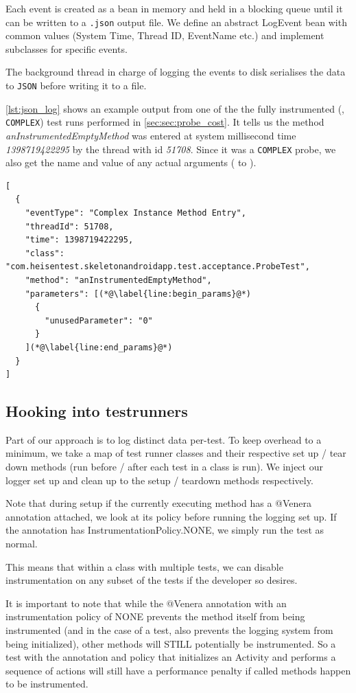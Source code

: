 Each event is created as a bean in memory and held in a blocking queue until it
can be written to a {\tt .json} output file. We define an abstract LogEvent bean
with common values (System Time, Thread ID, EventName etc.) and implement
subclasses for specific events.

The background thread in charge of logging the events to disk serialises the
data to {\tt JSON} before writing it to a file.

\autoref{lst:json_log} shows an example output from one of the the fully
instrumented (\ie, {\tt COMPLEX}) test runs performed in
\autoref{sec:sec:probe_cost}. It tells us the method
\textit{anInstrumentedEmptyMethod} was entered at system millisecond time
\textit{1398719422295} by the thread with id \textit{51708}. Since it was a
{\tt COMPLEX} probe, we also get the name and value of any actual arguments
( to ).

\begin{lstlisting}[label=lst:json_log]
[
  {
    "eventType": "Complex Instance Method Entry",
    "threadId": 51708,
    "time": 1398719422295,
    "class": "com.heisentest.skeletonandroidapp.test.acceptance.ProbeTest",
    "method": "anInstrumentedEmptyMethod",
    "parameters": [(*@\label{line:begin_params}@*)
      {
        "unusedParameter": "0"
      }
    ](*@\label{line:end_params}@*)
  }
]
\end{lstlisting}

\subsection{Hooking into testrunners}

Part of our approach is to log distinct data per-test. To keep overhead to a
minimum, we take a map of test runner classes and their respective set up / tear
down methods (run before / after each test in a class is run). We inject our
logger set up and clean up to the setup / teardown methods respectively.

Note that during setup if the currently executing method has a @Venera
annotation attached, we look at its policy before running the logging set up. If
the annotation has InstrumentationPolicy.NONE, we simply run the test as normal.

This means that within a class with multiple tests, we can disable
instrumentation on any subset of the tests if the developer so desires.

It is important to note that while the @Venera annotation with an
instrumentation policy of NONE prevents the method itself from being
instrumented (and in the case of a test, also prevents the logging system from
being initialized), other methods will STILL potentially be instrumented. So a
test with the annotation and policy that initializes an Activity and performs a
sequence of actions will still have a performance penalty if called methods
happen to be instrumented.


